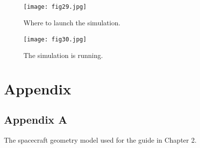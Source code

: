 \documentclass[a4paper, 11pt]{article}
\begin{document}
\begin{figure}[!ht]
    \centering
    \texttt{[image: fig29.jpg]}
    \caption{Where to launch the simulation.}
\end{figure}

\begin{figure}[!ht]
    \centering
    \texttt{[image: fig30.jpg]}
    \caption{The simulation is running.}
\end{figure}

\section{Appendix}
\subsection{Appendix A}

    The spacecraft geometry model used for the guide in Chapter 2.
\end{document}
